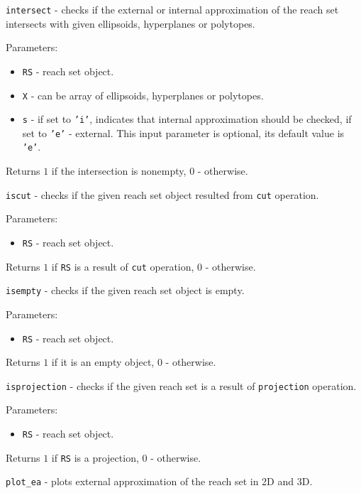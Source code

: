 \documentclass{report}
\begin{document}
{\Large {\tt intersect}} - checks if the external or internal approximation
of the reach set intersects with given ellipsoids, hyperplanes or
polytopes.

Parameters:
\begin{itemize}
\item {\tt RS} - reach set object.
\item {\tt X} - can be array of ellipsoids, hyperplanes or polytopes.
\item {\tt s} - if set to {\tt 'i'}, indicates that internal approximation
should be checked, if set to {\tt 'e'} - external. This input parameter
is optional, its default value is {\tt 'e'}.
\end{itemize}

Returns $1$ if the intersection is nonempty, $0$ - otherwise.

\newpage

{\Large {\tt iscut}} - checks if the given reach set object resulted
from {\tt cut} operation.

Parameters:
\begin{itemize}
\item {\tt RS} - reach set object.
\end{itemize}

Returns $1$ if {\tt RS} is a result of {\tt cut} operation, $0$ - otherwise.

\newpage

{\Large {\tt isempty}} - checks if the given reach set object is empty.

Parameters:
\begin{itemize}
\item {\tt RS} - reach set object.
\end{itemize}

Returns $1$ if it is an empty object, $0$ - otherwise.

\newpage

{\Large {\tt isprojection}} - checks if the given reach set is a result
of {\tt projection} operation.

Parameters:
\begin{itemize}
\item {\tt RS} - reach set object.
\end{itemize}

Returns $1$ if {\tt RS} is a projection, $0$ - otherwise.

\newpage

{\Large {\tt plot\_ea}} - plots external approximation of the reach set
in 2D and 3D.
\end{document}

